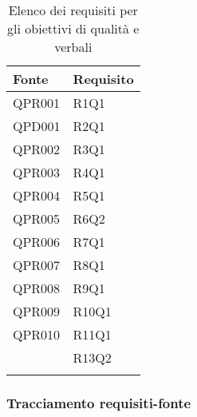 		\begin{table}[H]
		\centering
		{\def\arraystretch{1.5}
		\begin{tabularx}{\textwidth}{YY}
			\textbf{Fonte} & \textbf{Requisito} \\				
			\toprule
			QPR001 & R1Q1 \\
			QPD001 & R2Q1 \\
			QPR002 & R3Q1 \\
			QPR003 & R4Q1 \\
			QPR004 & R5Q1 \\
			QPR005 & R6Q2 \\
			QPR006 & R7Q1 \\
			QPR007 & R8Q1 \\
			QPR008 & R9Q1 \\
			QPR009 & R10Q1 \\
			QPR010 & R11Q1 \\
			 & R13Q2 \\
			\bottomrule\\
		\end{tabularx}}
		\caption{Elenco dei requisiti per gli obiettivi di qualità e verbali}
	\end{table}
		
\newcommand{\deV}{\addtocounter{V}{+1}} %
\newcommand{\addC}[0]{\theV \deV} %
\addtocounter{V}{1}		

\newcommand{\deVv}{\addtocounter{Vv}{+1}} %
\newcommand{\addVC}[0]{\theVv \deVv} %
\addtocounter{Vv}{1}		

\newcommand{\deX}{\addtocounter{X}{+1}} %
\newcommand{\addX}[0]{\theX \deX} %
\addtocounter{X}{1}	
		
		\subsubsection{Tracciamento requisiti-fonte}
		
